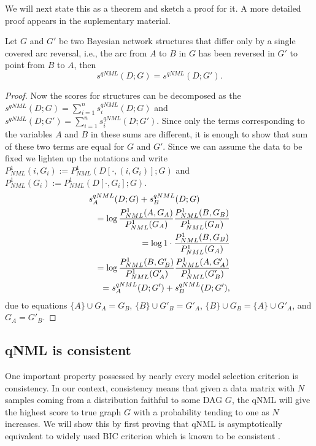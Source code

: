 We will next state this as a
theorem and sketch a proof for it. A more detailed proof appears in the
suplementary material.
\begin{theorem}
  \label{thm:scoreqv}
  Let $G$ and $G'$ be two Bayesian network structures that differ only
  by a single covered arc reversal, i.e., the arc from $A$ to $B$ in $G$
  has been reversed in $G'$ to point from $B$ to $A$, then
  $$s^{qNML}(D;G)=s^{qNML}(D;G').$$
\end{theorem}
\begin{proof}
  Now the scores for structures can be decomposed as the
  $s^{qNML}(D;G)=\sum_{i=1}^{n}s_i^{qNML}(D;G)$ and
  $s^{qNML}(D;G')=\sum_{i=1}^{n}s_i^{qNML}(D;G')$.  Since only the
  terms corresponding to the variables $A$ and $B$ in these sums are
  different, it is enough to show that sum of these two terms are
  equal for $G$ and $G'$. Since we can assume the data to be fixed we
  lighten up the notations and write
  $P^1_{NML}(i,G_i) := P^1_{NML}(D[\cdot,(i,G_i)];G)$ and
  $P^1_{NML}(G_i)   := P^1_{NML}(D[\cdot,G_i];G)$.
  \begin{eqnarray}
    \lefteqn{s_A^{qNML}(D;G)+s_B^{qNML}(D;G)} \nonumber\\
    && =\log\frac{P^1_{NML}(A,G_{A})}{P^1_{NML}(G_{A})}
            \frac{P^1_{NML}(B,G_{B})}{P^1_{NML}(G_{B})}\nonumber\\
    && =\log 1\cdot\frac{P^1_{NML}(B,G_{B})}{P^1_{NML}(G_{A})}\nonumber\\
    && =\log \frac{P^1_{NML}(B,G'_{B})}{P^1_{NML}(G'_{A})}
             \frac{P^1_{NML}(A,G'_{A})}{P^1_{NML}(G'_{B})}\nonumber\\
 && =s_A^{qNML}(D;G')+s_B^{qNML}(D;G'),\nonumber
\end{eqnarray}
  due to equations
  $\{A\}\cup G_A  = G_B$,
  $\{B\}\cup G'_B = G'_A$,
  $\{B\}\cup G_B  = \{A\} \cup G'_A$,
  and $G_A        = G'_B$.
\end{proof}

\subsection{qNML is consistent}

One important property possessed by nearly every model selection criterion is consistency. In our context, consistency means that given a data matrix with $N$ samples coming from a distribution faithful to some DAG $G$, the qNML will give the highest score to true graph $G$ with a probability tending to one as $N$ increases. We will show this by first proving that qNML is asymptotically equivalent to widely used BIC criterion which is known to be consistent \cite{Schw78, Haug88}. 

